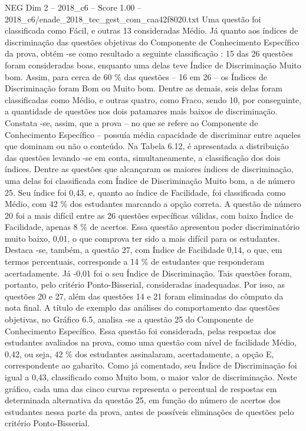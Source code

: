 \begin{textsample}{NEG Dim 2 – 2018\_c6 – Score 1.00 – 2018\_c6/enade\_2018\_tec\_gest\_com\_caa42f8020.txt}
Uma questão foi classificada como Fácil, e outras 13 consideradas Médio.
Já quanto aos índices de discriminação das questões objetivas do Componente de Conhecimento Específico da prova, obtém -se como resultado a seguinte classificação : 15 das 26 questões foram consideradas boas, enquanto uma delas teve Índice de Discriminação Muito bom.
Assim, para cerca de 60 \% das questões – 16 em 26 – os Índices de Discriminação foram Bom ou Muito bom.
Dentre as demais, seis delas foram classificadas como Médio, e outras quatro, como Fraco, sendo 10, por conseguinte, a quantidade de questões nos dois patamares mais baixos de discriminação.
Constata -se, assim, que a prova – no que se refere ao Componente de Conhecimento Específico – possuía média capacidade de discriminar entre aqueles que dominam ou não o conteúdo.
Na Tabela 6.12, é apresentada a distribuição das questões levando -se em conta, simultaneamente, a classificação dos dois índices.
Dentre as questões que alcançaram os maiores índices de discriminação, uma delas foi classificada com Índice de Discriminação Muito bom, a de número 25.
Seu índice foi 0,43, e, quanto ao índice de Facilidade, foi classificada como Médio, com 42 \% dos estudantes marcando a opção correta.
A questão de número 20 foi a mais difícil entre as 26 questões específicas válidas, com baixo Índice de Facilidade, apenas 8 \% de acertos.
Essa questão apresentou poder discriminatório muito baixo, 0,01, o que comprova ter sido a mais difícil para os estudantes.
Destaca -se, também, a questão 27, com Índice de Facilidade 0,14, o que, em termos percentuais, corresponde a 14 \% de estudantes que responderam acertadamente.
Já -0,01 foi o seu Índice de Discriminação.
Tais questões foram, portanto, pelo critério Ponto-Bisserial, consideradas inadequadas.
Por isso, as questões 20 e 27, além das questões 14 e 21 foram eliminadas do cômputo da nota final.
A título de exemplo das análises do comportamento das questões objetivas, no Gráfico 6.5, analisa -se a questão 25 do Componente de Conhecimento Específico.
Essa questão foi considerada, pelas respostas dos estudantes avaliados na prova, como uma questão com nível de facilidade Médio, 0,42, ou seja, 42 \% dos estudantes assinalaram, acertadamente, a opção E, correspondente ao gabarito.
Como já comentado, seu Índice de Discriminação foi igual a 0,43, classificado como Muito bom, o maior valor de discriminação.
Neste gráfico, cada uma das cinco curvas representa o percentual de respostas em determinada alternativa da questão 25, em função do número de acertos dos estudantes nessa parte da prova, antes de possíveis eliminações de questões pelo critério Ponto-Bisserial.

\end{textsample}
